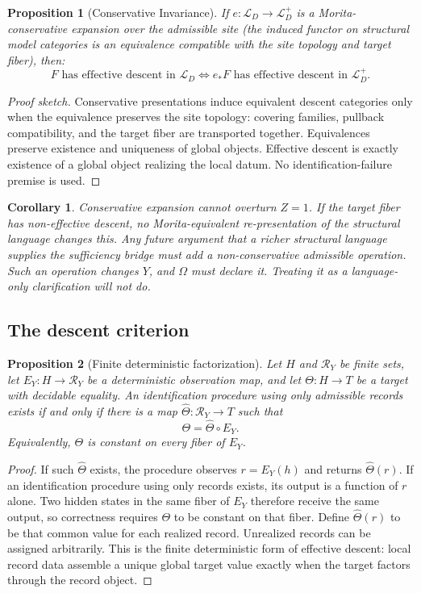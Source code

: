 \documentclass[11pt]{article}
\newtheorem*{corollary*}{Corollary}
\newtheorem*{proposition*}{Proposition}
\begin{document}
\begin{proposition*}[Conservative Invariance]
If $e: \mathcal{L}_D \to \mathcal{L}_D^+$ is a Morita-conservative expansion
over the admissible site (the induced functor on structural model categories
is an equivalence compatible with the site topology and target fiber), then:
\[
F \text{ has effective descent in } \mathcal{L}_D
\iff
e_* F \text{ has effective descent in } \mathcal{L}_D^+.
\]
\end{proposition*}

\begin{proof}[Proof sketch]
Conservative presentations induce equivalent descent categories only when the
equivalence preserves the site topology: covering families, pullback
compatibility, and the target fiber are transported together.
Equivalences preserve existence and uniqueness of global objects.
Effective descent is exactly existence of a global object realizing the local
datum.
No identification-failure premise is used.
\end{proof}

\begin{corollary*}
Conservative expansion cannot overturn $Z = 1$.
If the target fiber has non-effective descent, no Morita-equivalent
re-presentation of the structural language changes this.
Any future argument that a richer structural language supplies the sufficiency
bridge must add a non-conservative admissible operation. Such an operation
changes $Y$, and $\Omega$ must declare it. Treating it as a language-only
clarification will not do.
\end{corollary*}

\subsection{The descent criterion}
\label{sec:maintheorem}

\begin{proposition*}[Finite deterministic factorization]
Let $H$ and $\mathcal{R}_Y$ be finite sets, let $E_Y:H\to\mathcal{R}_Y$ be a
deterministic observation map, and let $\Theta:H\to T$ be a target with
decidable equality.
An identification procedure using only admissible records exists if and only
if there is a map $\widehat{\Theta}:\mathcal{R}_Y\to T$ such that
\[
\Theta=\widehat{\Theta}\circ E_Y.
\]
Equivalently, $\Theta$ is constant on every fiber of $E_Y$.
\end{proposition*}

\begin{proof}
If such $\widehat{\Theta}$ exists, the procedure observes $r=E_Y(h)$ and
returns $\widehat{\Theta}(r)$.
If an identification procedure using only records exists, its output is a
function of $r$ alone.
Two hidden states in the same fiber of $E_Y$ therefore receive the same output,
so correctness requires $\Theta$ to be constant on that fiber.
Define $\widehat{\Theta}(r)$ to be that common value for each realized record.
Unrealized records can be assigned arbitrarily.
This is the finite deterministic form of effective descent: local record data
assemble a unique global target value exactly when the target factors through
the record object.
\end{proof}
\end{document}
